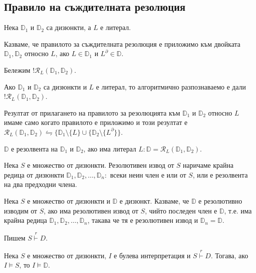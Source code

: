\documentclass{article}
\begin{document}
\subsection*{Правило на съждителната резолюция}

\begin{mydef}
Нека $\mathbb{D}_1$ и $\mathbb{D}_2$ са дизюнкти, а $L$ е литерал. 

Казваме, че правилото за съждителната резолюция е приложимо към двойката $\mathbb{D}_1, \mathbb{D}_2$ относно $L$, ако $L \in \mathbb{D}_1$ и $L^\partial \in \mathbb{D}$.

Бележим $!\mathcal{R}_L(\mathbb{D}_1, \mathbb{D}_2)$.

\begin{remark}
Ако $\mathbb{D}_1$ и $\mathbb{D}_2$ са дизюнкти и $L$ е литерал, то алгоритмично разпознаваемо е дали $!\mathcal{R}_L(\mathbb{D}_1, \mathbb{D}_2)$. 

Резултат от прилагането на правилото за резолюцията към $\mathbb{D}_1$ и $\mathbb{D}_2$ относно $L$ имаме само когато правилото е приложимо и този резултат е $\mathcal{R}_L(\mathbb{D}_1, \mathbb{D}_2) \leftrightharpoons \{\mathbb{D}_1\setminus \{L\} \cup \{\mathbb{D}_2\setminus \{L^\partial\}\}$.
\end{remark}
\end{mydef}

\begin{mydef}[Резолвента]
$\mathbb{D}$ е резолвента на $\mathbb{D}_1$ и $\mathbb{D}_2$, ако има литерал $L : \mathbb{D} =  \mathcal{R}_L(\mathbb{D}_1, \mathbb{D}_2)$.
\end{mydef}

\begin{mydef}
Нека $S$ е множество от дизюнкти. Резолютивен извод от $S$ наричаме крайна редица от дизюнкти $\mathbb{D}_1, \mathbb{D}_2, \ldots, \mathbb{D}_n :$ всеки неин член е или от $S$, или е резолвента на два предходни члена.
\end{mydef}

\begin{mydef}
Нека $S$ е множество от дизюнкти и $\mathbb{D}$ е дизюнкт. Казваме, че $\mathbb{D}$ е резолютивно изводим от $S$, ако има резолютивен извод от $S$, чийто последен член е $\mathbb{D}$, т.е. има крайна редица $\mathbb{D}_1, \mathbb{D}_2, \ldots, \mathbb{D}_n$, такава че тя е резолютивен извод и $\mathbb{D}_n = \mathbb{D}$.

Пишем $S \overset{r}{\vdash} D$.

\begin{remark}
Нека $S$ е множество от дизюнкти, $I$ е булева интерпретация и $S \overset{r}{\vdash} D$. Тогава, ако $I \models S$, то $I \models \mathbb{D}$.
\end{remark}
\end{mydef}
\end{document}
